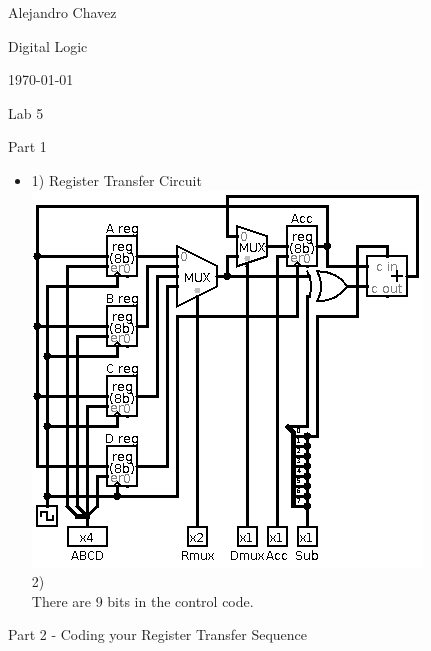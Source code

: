 \documentclass{article}
\begin{document}
\hfill Alejandro Chavez

\hfill Digital Logic

\hfill \today\\

\begin{center}\begin{large}Lab 5\end{large}\end{center}
  Part 1
\begin{itemize}
	\item
  1) Register Transfer Circuit\\
  \linebreak
  \includegraphics[scale=0.5]{Lab5_part1.png}\\
  2)\\
  There are 9 bits in the control code.
\end{itemize}
	Part 2 - Coding your Register Transfer Sequence
\end{document}
